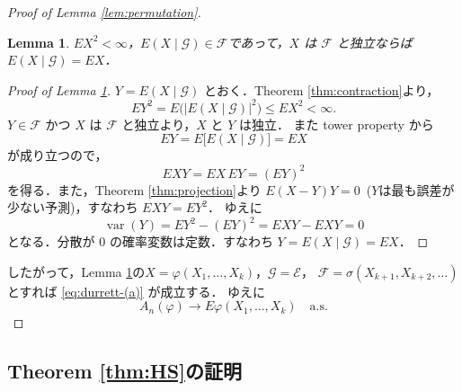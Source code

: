 \documentclass[a4paper,11pt,uplatex,dvipdfmx]{jsarticle}
\theoremstyle{plain}
\newtheorem{lemma}[theorem]{Lemma}
\theoremstyle{definition}
\DeclareMathOperator{\var}{var}
\begin{document}
\begin{proof}[Proof of Lemma \ref{lem:permutation}]
\begin{lemma}\label{lem:durrett-(b)}
$EX^2<\infty$，$E(X\mid\mathcal{G})\in\mathcal{F}$であって，$X$ は $\mathcal{F}$ と独立ならば
$E(X\mid\mathcal{G})=EX$．
\end{lemma}

\begin{proof}[Proof of Lemma \ref{lem:durrett-(b)}]
$Y=E(X\mid\mathcal{G})$ とおく．Theorem \ref{thm:contraction}より，
\[
  EY^2=E\bigl(\bigl|E(X\mid\mathcal{G})\bigr|^2\bigr)\le EX^2<\infty .
\]
$Y\in\mathcal{F}$ かつ $X$ は $\mathcal{F}$ と独立より，$X$ と $Y$ は独立．
また tower property から
\[
  EY=E\bigl[E(X\mid\mathcal{G})\bigr]=EX
\]
が成り立つので，
\[
  EXY=EX\,EY=(EY)^2
\]
を得る．また，Theorem \ref{thm:projection}より $E(X-Y)Y=0$\ ($Y$は最も誤差が少ない予測)，すなわち $EXY=EY^2$．
ゆえに
\[
  \var(Y)=EY^2-(EY)^2=EXY-EXY=0
\]
となる．分散が $0$ の確率変数は定数．すなわち $Y=E(X\mid\mathcal{G})=EX$．
\end{proof}

したがって，Lemma \ref{lem:durrett-(b)}の$X=\varphi(X_1,\dots,X_k)$，$\mathcal{G}=\mathcal{E}$，
$\mathcal{F}=\sigma(X_{k+1},X_{k+2},\dots)$ とすれば \eqref{eq:durrett-(a)} が成立する．
ゆえに
\[
  A_n(\varphi)\longrightarrow E\varphi(X_1,\dots,X_k)\quad\text{a.s.}
\]
\end{proof}

\subsection{Theorem \ref{thm:HS}の証明}
\end{document}
